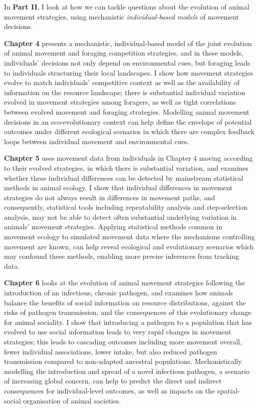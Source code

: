\noindent In \textbf{Part II}, I look at how we can tackle questions about the evolution of animal movement strategies, using mechanistic \textit{individual-based models} of movement decisions.

\medskip

\noindent \textbf{Chapter 4} presents a mechanistic, individual-based model of the joint evolution of animal movement and foraging competition strategies, and in these models, individuals' decisions not only depend on environmental cues, but foraging leads to individuals structuring their local landscapes.
I show how movement strategies evolve to match individuals' competitive context as well as the availability of information on the resource landscape; there is substantial individual variation evolved in movement strategies among foragers, as well as tight correlations between evolved movement and foraging strategies.
Modelling animal movement decisions in an eco-evolutionary context can help define the envelope of potential outcomes under different ecological scenarios in which there are complex feedback loops between individual movement and environmental cues.

\medskip

\noindent \textbf{Chapter 5} uses movement data from individuals in Chapter 4 moving according to their evolved strategies, in which there is substantial variation, and examines whether these individual differences can be detected by mainstream statistical methods in animal ecology.
I show that individual differences in movement strategies do not always result in differences in movement paths, and consequently, statistical tools including repeatability analysis and step-selection analysis, may not be able to detect often substantial underlying variation in animals' movement strategies.
Applying statistical methods common in movement ecology to simulated movement data where the mechanisms controlling movement are known, can help reveal ecological and evolutionary scenarios which may confound these methods, enabling more precise inferences from tracking data.

\medskip

\noindent \textbf{Chapter 6} looks at the evolution of animal movement strategies following the introduction of an infectious, chronic pathogen, and examines how animals balance the benefits of social information on resource distributions, against the risks of pathogen transmission, and the consequences of this evolutionary change for animal sociality.
I show that introducing a pathogen to a population that has evolved to use social information leads to very rapid changes in movement strategies; this leads to cascading outcomes including more movement overall, fewer individual associations, lower intake, but also reduced pathogen transmission compared to non-adapted ancestral populations.
Mechanistically modelling the introduction and spread of a novel infectious pathogen, a scenario of increasing global concern, can help to predict the direct and indirect consequences for individual-level outcomes, as well as impacts on the spatial-social organisation of animal societies.

\medskip


\endgroup

\vfill

\clearpage
